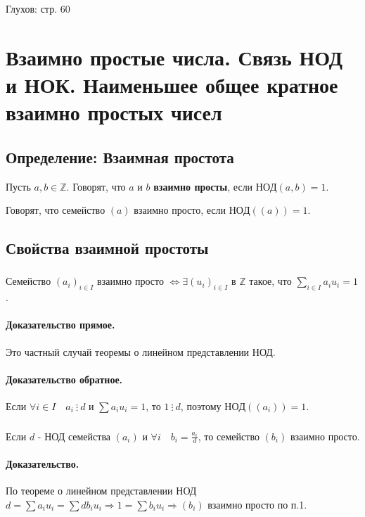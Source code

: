 \documentclass{article}
\newcommand{\cgcd}{\mathrm{НОД}}
\newcommand{\divs}{~\vdots~}
\begin{document}
Глухов: стр. 60


\newpage
\section{Взаимно простые числа. Связь НОД и НОК. Наименьшее общее кратное взаимно простых чисел}

\subsection{Определение: Взаимная простота}
Пусть $a, b \in \mathbb Z$. Говорят, что $a$ и $b$ \textbf{взаимно просты}, если $\cgcd(a, b) = 1$.

Говорят, что семейство $(a)$ взаимно просто, если $\cgcd((a)) = 1$.

\subsection{Свойства взаимной простоты}

\subsubsection{}
Семейство $(a_i)_{i \in I}$ взаимно просто $\Leftrightarrow \exists (u_i)_{i \in I} \text{ в } \mathbb Z$ такое, что $\sum_{i \in I}a_i u_i = 1$.
\paragraph{Доказательство прямое.}
Это частный случай теоремы о линейном представлении НОД.
\paragraph{Доказательство обратное.}
Если $\forall i \in I \quad a_i  \divs d$ и $\sum a_i u_i = 1$, то $1  \divs  d$, поэтому $\cgcd((a_i)) = 1$.

\subsubsection{}
Если $d$ - НОД семейства $(a_i)$ и $\forall i \quad b_i = \frac{a_i}{d}$, то семейство $(b_i)$ взаимно просто.
\paragraph{Доказательство.}
По теореме о линейном представлении НОД $d = \sum a_i u_i = \sum d b_i u_i \Rightarrow 1 = \sum b_i u_i \Rightarrow (b_i)$ взаимно просто по п.1.
\end{document}
